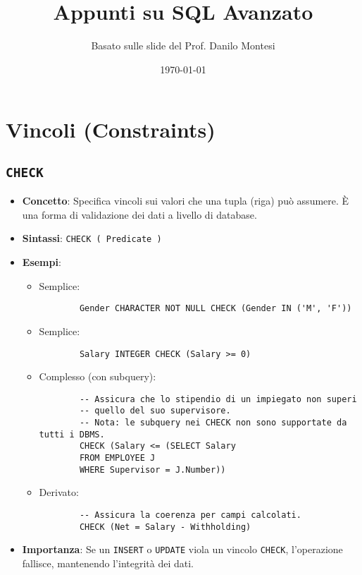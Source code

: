 \documentclass{article}
\title{Appunti su SQL Avanzato}
\author{Basato sulle slide del Prof. Danilo Montesi}
\date{\today}
\begin{document}
	
	\maketitle
	\tableofcontents
	\newpage
	
	\section{Vincoli (Constraints)}
	
	\subsection{\texttt{CHECK}}
	\begin{itemize}
		\item \textbf{Concetto}: Specifica vincoli sui valori che una tupla (riga) può assumere. È una forma di validazione dei dati a livello di database.
		\item \textbf{Sintassi}: \texttt{CHECK ( Predicate )}
		\item \textbf{Esempi}:
		\begin{itemize}
			\item Semplice:
			\begin{verbatim}
		Gender CHARACTER NOT NULL CHECK (Gender IN ('M', 'F'))
			\end{verbatim}
			\item Semplice:
			\begin{verbatim}
		Salary INTEGER CHECK (Salary >= 0)
			\end{verbatim}
			\item Complesso (con subquery):
			\begin{verbatim}
		-- Assicura che lo stipendio di un impiegato non superi
		-- quello del suo supervisore.
		-- Nota: le subquery nei CHECK non sono supportate da tutti i DBMS.
		CHECK (Salary <= (SELECT Salary
		FROM EMPLOYEE J
		WHERE Supervisor = J.Number))
			\end{verbatim}
			\item Derivato:
			\begin{verbatim}
		-- Assicura la coerenza per campi calcolati.
		CHECK (Net = Salary - Withholding)
			\end{verbatim}
		\end{itemize}
		\item \textbf{Importanza}: Se un \texttt{INSERT} o \texttt{UPDATE} viola un vincolo \texttt{CHECK}, l'operazione fallisce, mantenendo l'integrità dei dati.
	\end{itemize}
	
\end{document}
